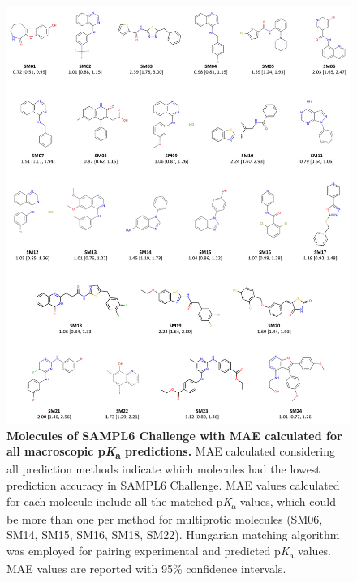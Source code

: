 \documentclass[9pt,lineno,final]{elife}
\newcommand{\pKa}{p\textit{K}\textsubscript{a}}
\begin{document}
\begin{figure}
\begin{center}
\includegraphics[width=0.95\linewidth]{figures/molecules_with_MAE_of_all_methods.pdf}
\caption{{\bf Molecules of SAMPL6 Challenge with MAE calculated for all macroscopic \pKa{} predictions.} MAE calculated considering all prediction methods indicate which molecules had the lowest prediction accuracy in SAMPL6 Challenge. MAE values calculated for each molecule include all the matched \pKa{} values, which could be more than one per method for multiprotic molecules (SM06, SM14, SM15, SM16, SM18, SM22). Hungarian matching algorithm was employed for pairing experimental and predicted \pKa{} values. MAE values are reported with 95\% confidence intervals.
}
\label{fig:molecules_with_MAE_of_all_methods}
\end{center}
\end{figure}
\end{document}
